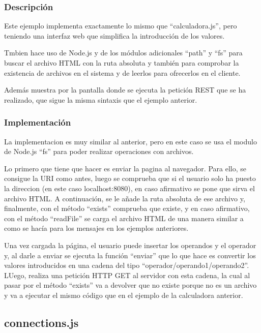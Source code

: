 \documentclass{article}
\begin{document}
\subsubsection{Descripción}
Este ejemplo implementa exactamente lo mismo que ``calculadora.js'', pero teniendo una interfaz web que simplifica la introducción de los valores.

Tmbien hace uso de Node.js y de los módulos adicionales ``path'' y ``fs'' para buscar el archivo HTML con la ruta absoluta y también para comprobar la existencia de archivos en el sistema y de leerlos para ofrecerlos en el cliente.



Además muestra por la pantalla donde se ejecuta la petición REST que se ha realizado, que sigue la misma sintaxis que el ejemplo anterior.

\subsubsection{Implementación}
La implementacion es muy similar al anterior, pero en este caso se usa el modulo de Node.js ``fs'' para poder realizar operaciones con archivos.

Lo primero que tiene que hacer es enviar la pagina al navegador. Para ello, se consigue la URI como antes, luego se comprueba que si el usuario solo ha puesto la direccion (en este caso localhost:8080), en caso afirmativo se pone que sirva el archivo HTML. A continuación, se le añade la ruta absoluta de ese archivo y, finalmente, con el método ``exists'' comprueba que existe, y en caso afirmativo, con el método ``readFile'' se carga el archivo HTML de una manera similar a como se hacía para los mensajes en los ejemplos anteriores.

Una vez cargada la página, el usuario puede insertar los operandos y el operador y, al darle a enviar se ejecuta la función ``enviar'' que lo que hace es convertir los valores introducidos en una cadena del tipo ``operador/operando1/operando2''. LUego, realiza una petición HTTP GET al servidor con esta cadena, la cual al pasar por el método ``exists'' va a devolver que no existe porque no es un archivo y va a ejecutar el mismo código que en el ejemplo de la calculadora anterior.


\subsection{connections.js}
\end{document}

